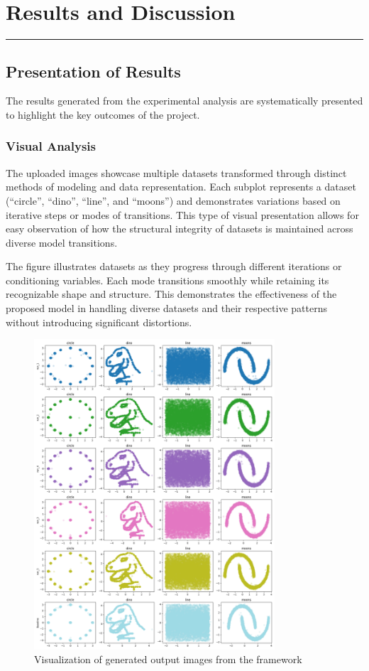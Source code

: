 \chapter{Results and Discussion}
\vspace{-1.5cm}
\hspace{-1cm}\rule{19cm}{0.4pt} 

\section{Presentation of Results}
The results generated from the experimental analysis are systematically presented to highlight the key outcomes of the project.
\subsection{Visual Analysis}
The uploaded images showcase multiple datasets transformed through distinct methods of modeling and data representation. Each subplot represents a dataset (``circle'', ``dino'', ``line'', and ``moons'') and demonstrates variations based on iterative steps or modes of transitions. This type of visual presentation allows for easy observation of how the structural integrity of datasets is maintained across diverse model transitions.
\begin{justify}
    The figure illustrates datasets as they progress through different iterations or conditioning variables. Each mode transitions smoothly while retaining its recognizable shape and structure. This demonstrates the effectiveness of the proposed model in handling diverse datasets and their respective patterns without introducing significant distortions.
\end{justify}

\begin{figure}
    \centering
    \includegraphics[width=0.8\textwidth, height=0.7\textwidth]{images/generated_images.png}
    \caption{Visualization of generated output images from the framework}
    \label{fig:output_a} %
\end{figure}

